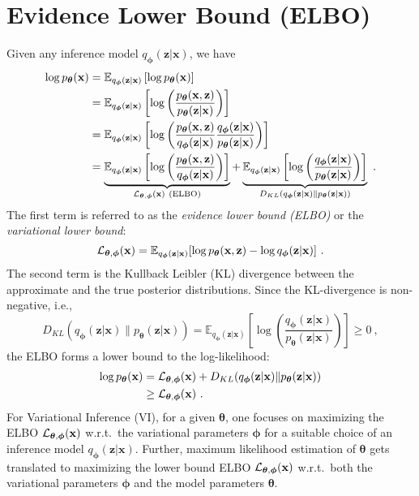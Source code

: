 \documentclass{article}
\newcommand{\x}{\mathbf{x}}
\newcommand{\z}{\mathbf{z}}
\newcommand{\cL}{{\cal L}}
\newcommand{\ttheta}{\boldsymbol{\theta}}
\newcommand{\pphi}{\boldsymbol{\phi}}
\newcommand\E{\mathbb{E}}
\begin{document}
\section{Evidence Lower Bound (ELBO)}
Given any inference model $q_{\pphi}(\z|\x)$, we have 
\begin{align*}
	\log p_{\ttheta}(\x) & = \E_{q_{\pphi}(\z|\x)}\left[ \log p_{\ttheta}(\x) \right] \\
	& = \E_{q_{\pphi}(\z|\x)}\left[ \log \left( \frac{p_{\ttheta}(\x,\z)}{p_{\ttheta}(\z|\x)} \right) \right] \\    
	& = \E_{q_{\pphi}(\z|\x)}\left[ \log \left( \frac{p_{\ttheta}(\x,\z)}{q_{\pphi}(\z|\x)} \frac{q_{\pphi}(\z|\x)}{p_{\ttheta}(\z|\x)}\right) \right] \\    
	& = \underbrace{\E_{q_{\pphi}(\z|\x)}\left[ \log \left( \frac{p_{\ttheta}(\x,\z)}{q_{\pphi}(\z|\x)} \right) \right]}_{\cL_{\ttheta,\pphi}(\x) ~\text{(ELBO)}} + \underbrace{\E_{q_{\pphi}(\z|\x)}\left[ \log \left( \frac{q_{\pphi}(\z|\x)}{p_{\ttheta}(\z|\x)}\right) \right]}_{D_{KL}(q_{\pphi}(\z|\x) \| p_{\ttheta}(\z|\x))}~. \\ 
\end{align*}
The first term is referred to as the {\em evidence lower bound (ELBO)} or the {\em variational lower bound}:
\begin{equation}
	\cL_{\ttheta,\pphi}(\x) = \E_{q_{\pphi}(\z|\x)}[\log p_{\ttheta}(\x,\z) - \log q_{\pphi}(\z|\x)]~.
\end{equation}
The second term is the Kullback Leibler (KL) divergence between the approximate and the true posterior distributions. Since the KL-divergence is non-negative, i.e.,
\begin{equation}
	D_{KL}(q_{\pphi}(\z|\x) \| p_{\ttheta}(\z|\x)) = \E_{q_{\pphi}(\z|\x)} \left[ \log \left( \frac{q_{\pphi}(\z|\x)}{p_{\ttheta}(\z|\x)} \right) \right] \geq 0~,
\end{equation}
the ELBO forms a lower bound to the log-likelihood:
\begin{align}
	\log p_{\ttheta}(\x) & = \cL_{\ttheta,\pphi}(\x) + D_{KL}(q_{\pphi}(\z|\x) \| p_{\ttheta}(\z|\x)) \\
	& \geq \cL_{\ttheta,\pphi}(\x)~.
\end{align}
For Variational Inference (VI), for a given $\ttheta$, one focuses on maximizing the ELBO $\cL_{\ttheta,\pphi}(\x)$ w.r.t.~the variational parameters $\pphi$ for a suitable choice of an inference model $q_{\pphi}(\z|\x)$. Further, maximum likelihood estimation of $\ttheta$ gets translated to maximizing the lower bound ELBO $\cL_{\ttheta,\pphi}(\x)$ w.r.t.~both the variational parameters $\pphi$ and the model parameters $\ttheta$. 
\end{document}
